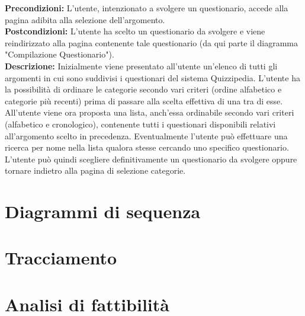 \documentclass[a4paper,11pt]{article}
\begin{document}
\textbf{Precondizioni:} L'utente, intenzionato a svolgere un questionario, accede alla pagina adibita alla selezione dell'argomento.\\
\textbf{Postcondizioni:} L'utente ha scelto un questionario da svolgere e viene reindirizzato alla pagina contenente tale questionario (da qui parte il diagramma "Compilazione Questionario").\\
\textbf{Descrizione:} Inizialmente viene presentato all'utente un'elenco di tutti gli argomenti in cui sono suddivisi i questionari del sistema Quizzipedia. L'utente ha la possibilità di ordinare le categorie secondo vari criteri (ordine alfabetico e categorie più recenti) prima di passare alla scelta effettiva di una tra di esse. All'utente viene ora proposta una lista, anch'essa ordinabile secondo vari criteri (alfabetico e cronologico), contenente tutti i questionari disponibili relativi all'argomento scelto in precedenza. Eventualmente l'utente può effettuare una ricerca per nome nella lista qualora stesse cercando uno specifico questionario. L'utente può quindi scegliere definitivamente un questionario da svolgere oppure tornare indietro alla pagina di selezione categorie.\\
\newpage
	\section{Diagrammi di sequenza}
	\newpage
	\section{Tracciamento}
	\newpage
	\section{Analisi di fattibilità}
\end{document}
